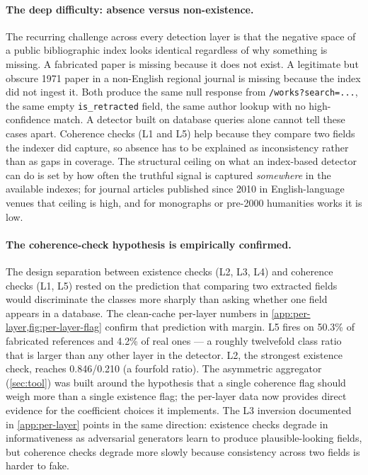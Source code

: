 \documentclass[12pt]{article}
\begin{document}
\paragraph{The deep difficulty: absence versus non-existence.} The recurring challenge across every detection layer is that the negative space of a public bibliographic index looks identical regardless of why something is missing. A fabricated paper is missing because it does not exist. A legitimate but obscure 1971 paper in a non-English regional journal is missing because the index did not ingest it. Both produce the same null response from \texttt{/works?search=...}, the same empty \texttt{is\_retracted} field, the same author lookup with no high-confidence match. A detector built on database queries alone cannot tell these cases apart. Coherence checks (L1 and L5) help because they compare two fields the indexer did capture, so absence has to be explained as inconsistency rather than as gaps in coverage. The structural ceiling on what an index-based detector can do is set by how often the truthful signal is captured \emph{somewhere} in the available indexes; for journal articles published since 2010 in English-language venues that ceiling is high, and for monographs or pre-2000 humanities works it is low.

\paragraph{The coherence-check hypothesis is empirically confirmed.} The design separation between existence checks (L2, L3, L4) and coherence checks (L1, L5) rested on the prediction that comparing two extracted fields would discriminate the classes more sharply than asking whether one field appears in a database. The clean-cache per-layer numbers in \cref{app:per-layer,fig:per-layer-flag} confirm that prediction with margin. L5 fires on 50.3\% of fabricated references and 4.2\% of real ones --- a roughly twelvefold class ratio that is larger than any other layer in the detector. L2, the strongest existence check, reaches 0.846/0.210 (a fourfold ratio). The asymmetric aggregator (\cref{sec:tool}) was built around the hypothesis that a single coherence flag should weigh more than a single existence flag; the per-layer data now provides direct evidence for the coefficient choices it implements. The L3 inversion documented in \cref{app:per-layer} points in the same direction: existence checks degrade in informativeness as adversarial generators learn to produce plausible-looking fields, but coherence checks degrade more slowly because consistency across two fields is harder to fake.
\end{document}
